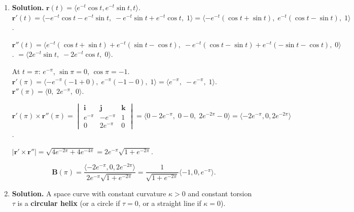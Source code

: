 \begin{enumerate}
$\mathbf{r}'\times\mathbf{r}''=\langle 12t^2-6t^2,\; 0-6t,\; 2-0\rangle = \langle 6t^2,-6t,2\rangle$.
$|\mathbf{r}'\times\mathbf{r}''|^2=36t^4+36t^2+4$.

$(\mathbf{r}'\times\mathbf{r}'')\cdot\mathbf{r}'''=\langle 6t^2,-6t,2\rangle\cdot\langle 0,0,6\rangle=12$.

$\tau(t)=\frac{12}{36t^4+36t^2+4}=\frac{3}{9t^4+9t^2+1}$.

By the Frenet--Serret formula, $\frac{d\mathbf{B}}{ds}=-\tau\,\mathbf{N}$, so
\[
\frac{d\mathbf{B}}{dt}=-\tau\,|\mathbf{r}'|\,\mathbf{N}.
\]
The torsion is $\tau=\frac{3}{9t^4+9t^2+1}$ and $|\mathbf{r}'|=\sqrt{1+4t^2+9t^4}$.

Therefore:
\[
\boxed{\frac{d\mathbf{B}}{dt}=-\frac{3\sqrt{1+4t^2+9t^4}}{9t^4+9t^2+1}\,\mathbf{N}(t).}
\]
(At $t=1$: $\tau=3/19$, $|\mathbf{r}'|=\sqrt{14}$, so $d\mathbf{B}/dt|_{t=1}=-\frac{3\sqrt{14}}{19}\,\mathbf{N}(1)$.)

\item \textbf{Solution.}
$\mathbf{r}(t)=\langle e^{-t}\cos t, e^{-t}\sin t, t\rangle$.
$\mathbf{r}'(t)=\langle -e^{-t}\cos t-e^{-t}\sin t,\; -e^{-t}\sin t+e^{-t}\cos t,\; 1\rangle = \langle -e^{-t}(\cos t+\sin t),\; e^{-t}(\cos t-\sin t),\; 1\rangle$.

$\mathbf{r}''(t)=\langle e^{-t}(\cos t+\sin t)+e^{-t}(\sin t-\cos t),\; -e^{-t}(\cos t-\sin t)+e^{-t}(-\sin t-\cos t),\; 0\rangle$.
$=\langle 2e^{-t}\sin t,\; -2e^{-t}\cos t,\; 0\rangle$.

At $t=\pi$: $e^{-\pi}$, $\sin\pi=0$, $\cos\pi=-1$.
$\mathbf{r}'(\pi)=\langle -e^{-\pi}(-1+0),\; e^{-\pi}(-1-0),\; 1\rangle = \langle e^{-\pi},\; -e^{-\pi},\; 1\rangle$.
$\mathbf{r}''(\pi)=\langle 0,\; 2e^{-\pi},\; 0\rangle$.

$\mathbf{r}'(\pi)\times\mathbf{r}''(\pi)=\begin{vmatrix}\mathbf{i}&\mathbf{j}&\mathbf{k}\\e^{-\pi}&-e^{-\pi}&1\\0&2e^{-\pi}&0\end{vmatrix}=\langle 0-2e^{-\pi},\; 0-0,\; 2e^{-2\pi}-0\rangle = \langle -2e^{-\pi}, 0, 2e^{-2\pi}\rangle$.

$|\mathbf{r}'\times\mathbf{r}''|=\sqrt{4e^{-2\pi}+4e^{-4\pi}}=2e^{-\pi}\sqrt{1+e^{-2\pi}}$.

\[
\boxed{\mathbf{B}(\pi)=\frac{\langle -2e^{-\pi}, 0, 2e^{-2\pi}\rangle}{2e^{-\pi}\sqrt{1+e^{-2\pi}}}=\frac{1}{\sqrt{1+e^{-2\pi}}}\langle -1, 0, e^{-\pi}\rangle.}
\]

\item \textbf{Solution.}
A space curve with constant curvature $\kappa>0$ and constant torsion $\tau$ is a \textbf{circular helix} (or a circle if $\tau=0$, or a straight line if $\kappa=0$).


\end{enumerate}
